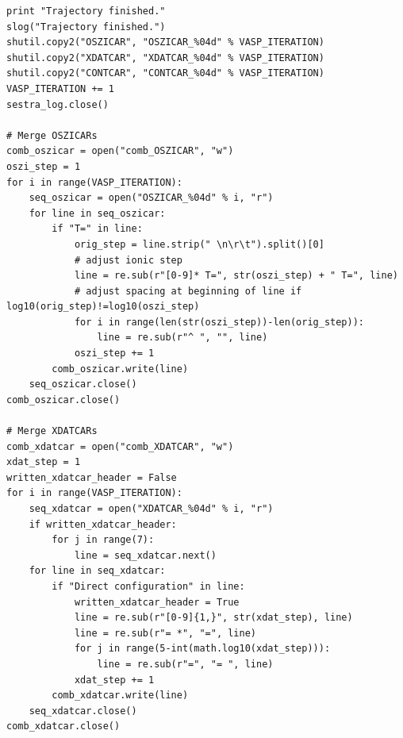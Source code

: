 \documentclass[twoside, 11pt, titlepage, captions=nooneline, a4paper, headsepline]{scrbook}%
\newcommand{\9}{\mathrm}
\newcommand{\0}{\,\mathrm}
\begin{document}
\begin{lstlisting}
print "Trajectory finished."
slog("Trajectory finished.")
shutil.copy2("OSZICAR", "OSZICAR_%04d" % VASP_ITERATION)
shutil.copy2("XDATCAR", "XDATCAR_%04d" % VASP_ITERATION)
shutil.copy2("CONTCAR", "CONTCAR_%04d" % VASP_ITERATION)
VASP_ITERATION += 1
sestra_log.close()

# Merge OSZICARs
comb_oszicar = open("comb_OSZICAR", "w")
oszi_step = 1
for i in range(VASP_ITERATION):
    seq_oszicar = open("OSZICAR_%04d" % i, "r")
    for line in seq_oszicar:
        if "T=" in line:
            orig_step = line.strip(" \n\r\t").split()[0]
            # adjust ionic step
            line = re.sub(r"[0-9]* T=", str(oszi_step) + " T=", line)        
            # adjust spacing at beginning of line if log10(orig_step)!=log10(oszi_step)
            for i in range(len(str(oszi_step))-len(orig_step)):
                line = re.sub(r"^ ", "", line)   
            oszi_step += 1
        comb_oszicar.write(line)
    seq_oszicar.close()
comb_oszicar.close()

# Merge XDATCARs
comb_xdatcar = open("comb_XDATCAR", "w")
xdat_step = 1
written_xdatcar_header = False
for i in range(VASP_ITERATION):
    seq_xdatcar = open("XDATCAR_%04d" % i, "r")
    if written_xdatcar_header:
        for j in range(7):
            line = seq_xdatcar.next()
    for line in seq_xdatcar:
        if "Direct configuration" in line:
            written_xdatcar_header = True
            line = re.sub(r"[0-9]{1,}", str(xdat_step), line)
            line = re.sub(r"= *", "=", line)
            for j in range(5-int(math.log10(xdat_step))):
                line = re.sub(r"=", "= ", line)
            xdat_step += 1
        comb_xdatcar.write(line)
    seq_xdatcar.close()
comb_xdatcar.close()   
\end{lstlisting}


\printindex
\end{document}
